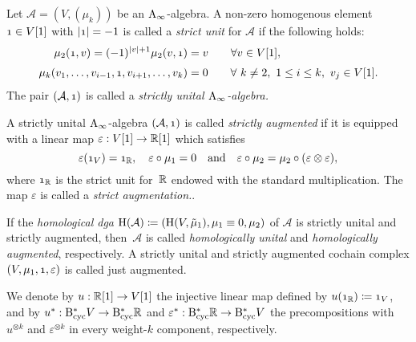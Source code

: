 \documentclass[\MainFolder/Text.tex]{subfiles}
\begin{document}
\begin{Definition}\label{Def:AugUnit}
Let $\mathcal{A}= (V, (\mu_k))$ be an $\mathrm{A}_\infty$-algebra. A non-zero homogenous element $\NOne \in V[1]$ with $\Abs{\NOne} = -1$ is called a \emph{strict unit} for $\mathcal{A}$ if the following holds:
\begin{align*} \mu_2(\NOne, v) = (-1)^{\Abs{v} + 1}\mu_2(v,\NOne) &= v\qquad\forall v\in V[1], \\[\jot]
\mu_k(v_1, \dotsc, v_{i-1}, \NOne, v_{i+1}, \dotsc, v_k) &= 0\qquad\forall\ k\neq 2,\ 1\le i \le k,\ v_j \in V[1]. \end{align*}
The pair $(\mathcal{A},\NOne)$ is called a \emph{strictly unital  $\mathrm{A}_\infty$-algebra.}

A strictly unital $\mathrm{A}_\infty$-algebra $(\mathcal{A},\NOne)$ is called \emph{strictly augmented} if it is equipped with a linear map $\varepsilon: V[1] \rightarrow \mathbb{R}[1]$ which satisfies
$$ \varepsilon(\NOne_V) = \NOne_\R, \quad \varepsilon \circ \mu_1 = 0\quad\text{and}\quad \varepsilon \circ \mu_2 = \mu_2\circ(\varepsilon \otimes \varepsilon), $$
where $\NOne_\R$ is the strict unit for~$\mathbb{R}$ endowed with the standard multiplication. The map $\varepsilon$ is called a \emph{strict augmentation.}.

If the \emph{homological dga} $\mathrm{H}(\mathcal{A})\coloneqq (\mathrm{H}(V,\tilde{\mu}_1), \mu_1 \equiv 0, \mu_2)$ of $\mathcal{A}$ is strictly unital and strictly augmented, then~$\mathcal{A}$ is called \emph{homologically unital} and \emph{homologically augmented}, respectively. A strictly unital and strictly augmented cochain complex $(V,\mu_1,\NOne,\varepsilon)$ is called just augmented. 
\end{Definition}

We denote by $u: \mathbb{R}[1] \rightarrow V[1]$ the injective linear map defined by $u(\NOne_\R)\coloneqq \NOne_V$, and by $u^*: \mathrm{B}_{\mathrm{cyc}}^* V \rightarrow \mathrm{B}_{\mathrm{cyc}}^* \mathbb{R}$ and $\varepsilon^*: \mathrm{B}_{\mathrm{cyc}}^* \mathbb{R} \rightarrow \mathrm{B}_{\mathrm{cyc}}^* V$ the precompositions with $u^{\otimes k}$ and $\varepsilon^{\otimes k}$ in every weight-$k$ component, respectively. 
\end{document}

